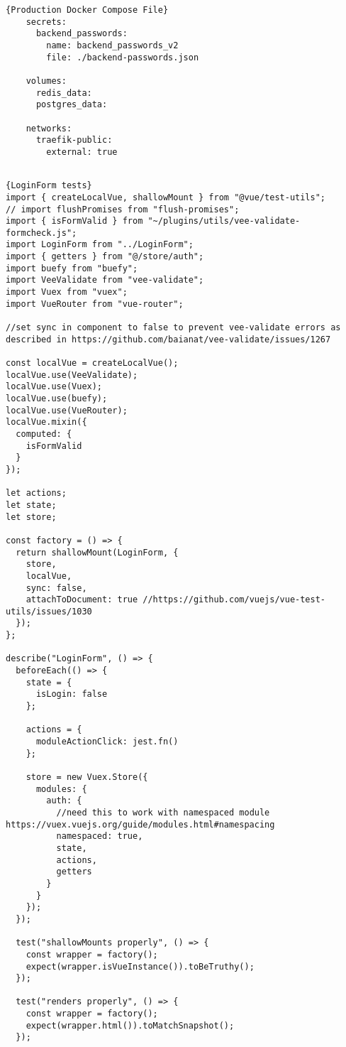 \begin{lstlisting}[caption=Production Docker Compose File, captionpos=b, style=htmlcssjs, label=dockerprod]{Production Docker Compose File}
    secrets:
      backend_passwords:
        name: backend_passwords_v2
        file: ./backend-passwords.json
      
    volumes:  
      redis_data:
      postgres_data:
    
    networks:
      traefik-public:
        external: true
    
  \end{lstlisting}


\begin{lstlisting}[caption=LoginForm tests, captionpos=b, style=htmlcssjs, label=loginformtest]{LoginForm tests}
import { createLocalVue, shallowMount } from "@vue/test-utils";
// import flushPromises from "flush-promises";
import { isFormValid } from "~/plugins/utils/vee-validate-formcheck.js";
import LoginForm from "../LoginForm";
import { getters } from "@/store/auth";
import buefy from "buefy";
import VeeValidate from "vee-validate";
import Vuex from "vuex";
import VueRouter from "vue-router";

//set sync in component to false to prevent vee-validate errors as described in https://github.com/baianat/vee-validate/issues/1267

const localVue = createLocalVue();
localVue.use(VeeValidate);
localVue.use(Vuex);
localVue.use(buefy);
localVue.use(VueRouter);
localVue.mixin({
  computed: {
    isFormValid
  }
});

let actions;
let state;
let store;

const factory = () => {
  return shallowMount(LoginForm, {
    store,
    localVue,
    sync: false,
    attachToDocument: true //https://github.com/vuejs/vue-test-utils/issues/1030
  });
};

describe("LoginForm", () => {
  beforeEach(() => {
    state = {
      isLogin: false
    };

    actions = {
      moduleActionClick: jest.fn()
    };

    store = new Vuex.Store({
      modules: {
        auth: {
          //need this to work with namespaced module https://vuex.vuejs.org/guide/modules.html#namespacing
          namespaced: true,
          state,
          actions,
          getters
        }
      }
    });
  });

  test("shallowMounts properly", () => {
    const wrapper = factory();
    expect(wrapper.isVueInstance()).toBeTruthy();
  });

  test("renders properly", () => {
    const wrapper = factory();
    expect(wrapper.html()).toMatchSnapshot();
  });


\end{lstlisting}
